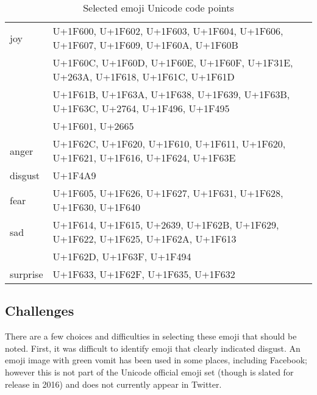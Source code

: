 \documentclass[10pt, a4paper]{article}
\begin{document}
\begin{table}
	\begin{tabular}{ll}
joy      & {\tiny U+1F600, U+1F602, U+1F603, U+1F604, U+1F606, U+1F607, U+1F609, U+1F60A, U+1F60B} \\
         & {\tiny U+1F60C, U+1F60D, U+1F60E, U+1F60F, U+1F31E, U+263A, U+1F618, U+1F61C, U+1F61D} \\
         & {\tiny U+1F61B, U+1F63A, U+1F638, U+1F639, U+1F63B, U+1F63C, U+2764, U+1F496, U+1F495} \\
         & {\tiny U+1F601, U+2665} \\
anger    & {\tiny U+1F62C, U+1F620, U+1F610, U+1F611, U+1F620, U+1F621, U+1F616, U+1F624, U+1F63E} \\
disgust  & {\tiny U+1F4A9} \\
fear     & {\tiny U+1F605, U+1F626, U+1F627, U+1F631, U+1F628, U+1F630, U+1F640} \\
sad      & {\tiny U+1F614, U+1F615, U+2639, U+1F62B, U+1F629, U+1F622, U+1F625, U+1F62A, U+1F613} \\
         & {\tiny U+1F62D, U+1F63F, U+1F494} \\
surprise & {\tiny U+1F633, U+1F62F, U+1F635, U+1F632} \\
	\end{tabular}
	\caption{Selected emoji Unicode code points}
	\label{tab:selected-emoji-codpoints}
\end{table}

\subsection{Challenges}

There are a few choices and difficulties in selecting these emoji that should be noted.
First, it was difficult to identify emoji that clearly indicated disgust. 
An emoji image with green vomit has been used in some places, including Facebook; however this is not part of the Unicode official emoji set (though is slated for release in 2016) and does not currently appear in Twitter.
\end{document}

